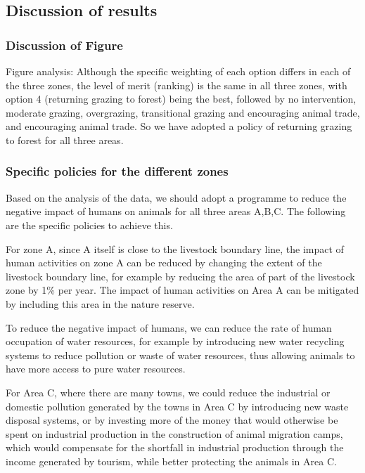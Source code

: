 \documentclass{mcmthesis}
\numberwithin{figure}{section}
\numberwithin{table}{section}
\numberwithin{equation}{section}
\begin{document}
\subsection{Discussion of results}
\subsubsection{Discussion of Figure}
Figure analysis: Although the specific weighting of each option differs in each of the three zones, the level of merit (ranking) is the same in all three zones, with option 4 (returning grazing to forest) being the best, followed by no intervention, moderate grazing, overgrazing, transitional grazing and encouraging animal trade, and encouraging animal trade. So we have adopted a policy of returning grazing to forest for all three areas.
\subsubsection{Specific policies for the different zones}
Based on the analysis of the data, we should adopt a programme to reduce the negative impact of humans on animals for all three areas A,B,C. The following are the specific policies to achieve this.



For zone A, since A itself is close to the livestock boundary line, the impact of human activities on zone A can be reduced by changing the extent of the livestock boundary line, for example by reducing the area of part of the livestock zone by 1\% per year. The impact of human activities on Area A can be mitigated by including this area in the nature reserve.

To reduce the negative impact of humans, we can reduce the rate of human occupation of water resources, for example by introducing new water recycling systems to reduce pollution or waste of water resources, thus allowing animals to have more access to pure water resources.

For Area C, where there are many towns, we could reduce the industrial or domestic pollution generated by the towns in Area C by introducing new waste disposal systems, or by investing more of the money that would otherwise be spent on industrial production in the construction of animal migration camps, which would compensate for the shortfall in industrial production through the income generated by tourism, while better protecting the animals in Area C.
\end{document}
